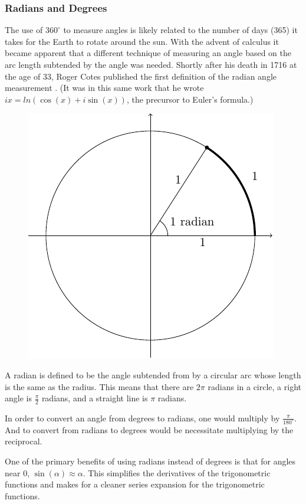 \documentclass[
]{book}
\theoremstyle{definition}
\theoremstyle{definition}
\theoremstyle{definition}
\theoremstyle{remark}
\begin{document}
\hypertarget{radians-and-degrees}{%
\subsubsection{Radians and Degrees}\label{radians-and-degrees}}

The use of \(360^\circ\) to measure angles is likely related to the number of days (365) it takes for the Earth to rotate around the sun. With the advent of calculus it became apparent that a different technique of measuring an angle based on the arc length subtended by the angle was needed. Shortly after his death in 1716 at the age of 33, Roger Cotes published the first definition of the radian angle measurement \citeyearpar{Cotes}. (It was in this same work that he wrote \(ix=ln(\cos(x) + i\sin(x))\), the precursor to Euler's formula.)

\begin{figure}

{\centering \includegraphics[width=0.5\linewidth]{tikz/radian} 

}

\end{figure}

A radian is defined to be the angle subtended from by a circular arc whose length is the same as the radius. This means that there are \(2\pi\) radians in a circle, a right angle is \(\frac{\pi}{2}\) radians, and a straight line is \(\pi\) radians.

In order to convert an angle from degrees to radians, one would multiply by \(\frac{\pi}{180^\circ}\). And to convert from radians to degrees would be necessitate multiplying by the reciprocal.

One of the primary benefits of using radians instead of degrees is that for angles near \(0\), \(\sin(\alpha) \approx \alpha\). This simplifies the derivatives of the trigonometric functions and makes for a cleaner series expansion for the trigonometric functions.
\end{document}
